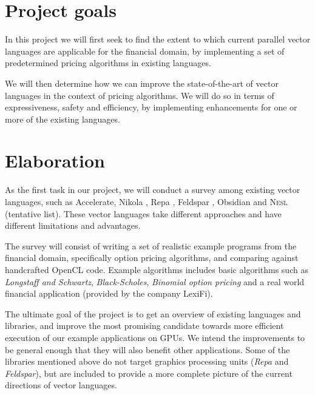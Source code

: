 \documentclass[10pt,a4paper,final,oneside,openany,article]{memoir}
\begin{document}
\chapter{Project goals}
In this project we will first seek to find the extent to which
current parallel vector languages are applicable for the financial
domain, by implementing a set of predetermined pricing algorithms in
existing languages.

We will then determine how we can improve the state-of-the-art of
vector languages in the context of pricing algorithms. We will do so
in terms of expressiveness, safety and efficiency, by implementing
enhancements for one or more of the existing languages.

\chapter{Elaboration}


As the first task in our project, we will conduct a survey among
existing vector languages, such as
Accelerate\cite{chakravarty2011accelerating}, Nikola
\cite{mainland2010nikola}, Repa \cite{keller2010regular}, Feldspar
\cite{axelsson2010feldspar}, Obsidian \cite{svensson2011obsidian} and
\textsc{Nesl} \cite{nesl} (tentative list). These vector languages
take different approaches and have different limitations and
advantages.

The survey will consist of writing a set of realistic example programs
from the financial domain, specifically option pricing algorithms, and
comparing against handcrafted OpenCL code. Example algorithms includes
basic algorithms such as \textit{Longstaff and Schwartz},
\textit{Black-Scholes}, \textit{Binomial option pricing} and a real
world financial application (provided by the company LexiFi).

The ultimate goal of the project is to get an overview of existing
languages and libraries, and improve the most promising candidate
towards more efficient execution of our example applications on
GPUs. We intend the improvements to be general enough that they will
also benefit other applications. Some of the libraries mentioned above
do not target graphics processing units (\textit{Repa} and
\textit{Feldspar}), but are included to provide a more complete
picture of the current directions of vector languages.
\end{document}
